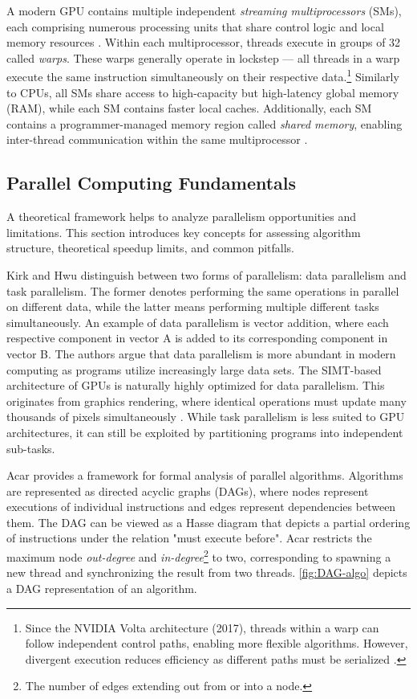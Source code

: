 \documentclass[english,12pt,a4paper,pdftex,sci,utf8]{aaltothesis}
\begin{document}
A modern GPU contains multiple independent \emph{streaming multiprocessors} (SMs), each comprising numerous processing units that share control logic and local memory resources \cite{kirk2016programming, cuda2025guide}. Within each multiprocessor, threads execute in groups of 32 called \emph{warps}. These warps generally operate in lockstep --- all threads in a warp execute the same instruction simultaneously on their respective data.\footnote{Since the NVIDIA Volta architecture (2017), threads within a warp can follow independent control paths, enabling more flexible algorithms. However, divergent execution reduces efficiency as different paths must be serialized \cite{cuda2025guide}.} Similarly to CPUs, all SMs share access to high-capacity but high-latency global memory (RAM), while each SM contains faster local caches. Additionally, each SM contains a programmer-managed memory region called \emph{shared memory}, enabling inter-thread communication within the same multiprocessor \cite{sanders2010cuda, cuda2025guide}.

\subsection{Parallel Computing Fundamentals}\label{subsec:parallell}

A theoretical framework helps to analyze parallelism opportunities and limitations. This section introduces key concepts for assessing algorithm structure, theoretical speedup limits, and common pitfalls.

Kirk and Hwu \cite{kirk2016programming} distinguish between two forms of parallelism: data parallelism and task parallelism. The former denotes performing the same operations in parallel on different data, while the latter means performing multiple different tasks simultaneously. An example of data parallelism is vector addition, where each respective component in vector A is added to its corresponding component in vector B. The authors argue that data parallelism is more abundant in modern computing as programs utilize increasingly large data sets. The SIMT-based architecture of GPUs is naturally highly optimized for data parallelism. This originates from graphics rendering, where identical operations must update many thousands of pixels simultaneously \cite{sanders2010cuda}.  While task parallelism is less suited to GPU architectures, it can still be exploited by partitioning programs into independent sub-tasks.

Acar \cite{acar2016parallel} provides a framework for formal analysis of parallel algorithms. Algorithms are represented as directed acyclic graphs (DAGs), where nodes represent executions of individual instructions and edges represent dependencies between them. The DAG can be viewed as a Hasse diagram that depicts a partial ordering of instructions under the relation "must execute before". Acar restricts the maximum node \emph{out-degree} and \emph{in-degree}\footnote{The number of edges extending out from or into a node.} to two, corresponding to spawning a new thread and synchronizing the result from two threads. \cref{fig:DAG-algo} depicts a DAG representation of an algorithm.
\end{document}
